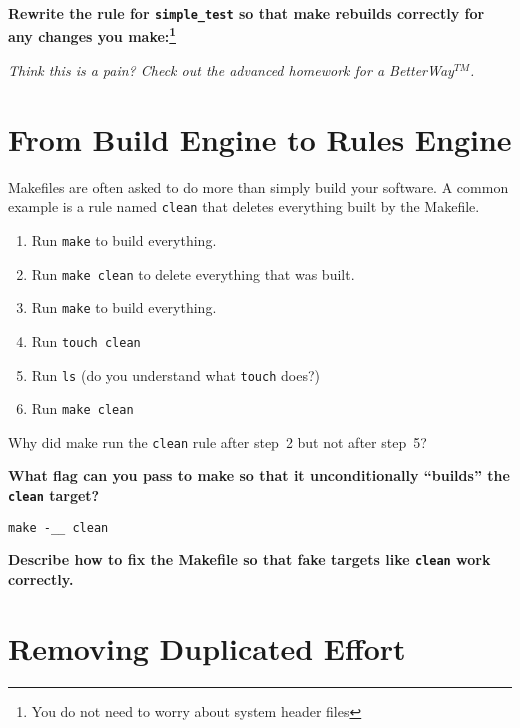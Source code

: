 \documentclass{article}
\begin{document}
\textbf{Rewrite the rule for \texttt{simple\_test} so that make rebuilds
correctly for any changes you make:\footnote{You do not need to worry about
  system header files}}
\vspace{2cm}

\emph{\small Think this is a pain? Check out the advanced homework for a
  BetterWay$^{TM}$.}


\section{From Build Engine to Rules Engine}

Makefiles are often asked to do more than simply build your software. A common
example is a rule named \texttt{clean} that deletes everything built by the
Makefile.

\begin{enumerate}\small
  \item Run \texttt{make} to build everything.
  \item Run \texttt{make clean} to delete everything that was built.
  \item Run \texttt{make} to build everything.
  \item Run \texttt{touch clean}
  \item Run \texttt{ls} {(\footnotesize do you understand what \texttt{touch} does?)}
  \item Run \texttt{make clean}
\end{enumerate}

Why did make run the \texttt{clean} rule after step~2 but not after step~5?

\textbf{What flag can you pass to make so that it unconditionally ``builds''
  the \texttt{clean} target?}

\texttt{make -\_\_ clean}

\textbf{Describe how to fix the Makefile so that fake targets like \texttt{clean} work correctly.}
\vspace{2cm}

\section{Removing Duplicated Effort}
\end{document}
